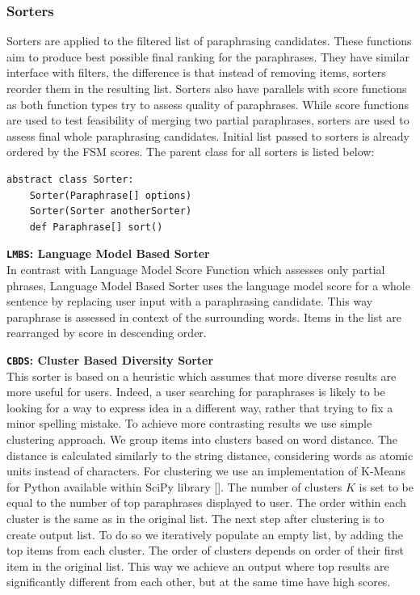 \subsubsection{Sorters}

Sorters are applied to the filtered list of paraphrasing candidates. These functions aim to produce best possible final ranking for the paraphrases. They have similar interface with filters, the difference is that instead of removing items, sorters reorder them in the resulting list. Sorters also have parallels with score functions as both function types try to assess quality of paraphrases. While score functions are used to test feasibility of merging two partial paraphrases, sorters are used to assess final whole paraphrasing candidates. Initial list passed to sorters is already ordered by the FSM scores. The parent class for all sorters is listed below:

\begin{verbatim}
abstract class Sorter:
    Sorter(Paraphrase[] options)
    Sorter(Sorter anotherSorter)
    def Paraphrase[] sort()
\end{verbatim}


\begin{flushleft}

\textbf{\texttt{LMBS}: \textbf{Language Model Based Sorter}} \\
In contrast with Language Model Score Function which assesses only partial phrases, Language Model Based Sorter uses the language model score for a whole sentence by replacing user input with a paraphrasing candidate. This way paraphrase is assessed in context of the surrounding words. Items in the list are rearranged by score in descending order. 
\bigskip

\textbf{\texttt{CBDS}: \textbf{Cluster Based Diversity Sorter}} \\
This sorter is based on a heuristic which assumes that more diverse results are more useful for users. Indeed, a user searching for paraphrases is likely to be looking for a way to express idea in a different way, rather that trying to fix a minor spelling mistake. To achieve more contrasting results we use simple clustering approach. We group items into clusters based on word distance. The distance is calculated similarly to the string distance, considering words as atomic units instead of characters. For clustering we use an implementation of K-Means for Python available within SciPy library []. The number of clusters $K$ is set to be equal to the number of top paraphrases displayed to user. The order within each cluster is the same as in the original list. The next step after clustering is to create output list. To do so we iteratively populate an empty list, by adding the top items from each cluster. The order of clusters depends on order of their first item in the original list. This way we achieve an output where top results are significantly different from each other, but at the same time have high scores.
\bigskip

\end{flushleft}


